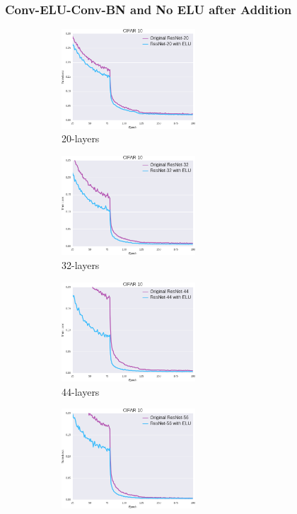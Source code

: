 \documentclass[10pt,twocolumn,letterpaper]{article}
\begin{document}
\subsubsection{Conv-ELU-Conv-BN and No ELU after Addition}

\begin{figure}
    \centering
    \begin{subfigure}{.33\linewidth}
        \centering
        \includegraphics[width=5cm]{TrainLoss20}
        \caption{20-layers}
        \label{fig:Cifar10TrainLoss20}
    \end{subfigure}
    \begin{subfigure}{.33\linewidth}
        \centering
        \includegraphics[width=5cm]{TrainLoss32}
        \caption{32-layers}
        \label{fig:Cifar10TrainLoss32}
    \end{subfigure}
    \begin{subfigure}{.33\linewidth}
        \centering
        \includegraphics[width=5cm]{TrainLoss44}
        \caption{44-layers}
        \label{fig:Cifar10TrainLoss44}
    \end{subfigure}
    \begin{subfigure}{.4\linewidth}
        \centering
        \includegraphics[width=5cm]{TrainLoss56}

\end{subfigure}
\end{figure}
\end{document}
